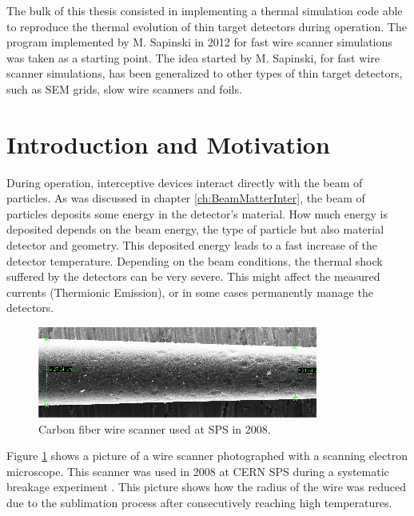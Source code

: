 \pagestyle{fancy}

\graphicspath{ {Figures/Chapter4_ThermalModel/} }

The bulk of this thesis consisted in implementing a thermal simulation code able to reproduce the thermal evolution of thin target detectors during operation.
The program implemented by M. Sapinski in 2012 for fast wire scanner simulations \parencite[][]{ref:Msapinski} was taken as a starting point. The idea started by M. Sapinski, for fast wire scanner simulations, has been generalized to other types of thin target detectors, such as SEM grids, slow wire scanners and foils. 

\section{Introduction and Motivation}
\label{sec:Motivation}

During operation, interceptive devices interact directly with the beam of particles. As was discussed in chapter \ref{ch:BeamMatterInter}, the beam of particles deposits some energy in the detector's material. How much energy is deposited depends on the beam energy, the type of particle but also material detector and geometry. This deposited energy leads to a fast increase of the detector temperature. Depending on the beam conditions, the thermal shock suffered by the detectors can be very severe. This might affect the measured currents (Thermionic Emission), or in some cases permanently manage the detectors. 

\begin{figure}[h]
    \centering
    \includegraphics[width=0.60\columnwidth]{WireRadiusDeterioration/WireDamage.png}
    \caption{Carbon fiber wire scanner used at SPS in 2008.}
    \label{fig:WireRadius}
\end{figure}

Figure \ref{fig:WireRadius} shows a picture of a wire scanner photographed with a scanning electron microscope. This scanner was used in 2008 at CERN SPS during a systematic breakage experiment \parencite[][]{ref:Msapinski}. This picture shows how the radius of the wire was reduced due to the sublimation process after consecutively reaching high temperatures.

